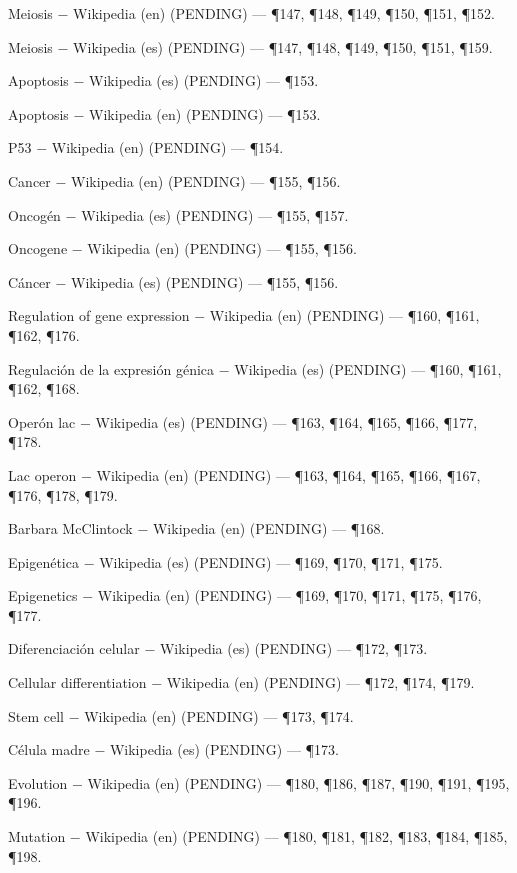 \documentclass{book}
\begin{document}
\noindent Meiosis \(-\) Wikipedia (en) (PENDING) --- \P147, \P148, \P149, \P150, \P151, \P152.

\noindent Meiosis \(-\) Wikipedia (es) (PENDING) --- \P147, \P148, \P149, \P150, \P151, \P159.

\noindent Apoptosis \(-\) Wikipedia (es) (PENDING) --- \P153.

\noindent Apoptosis \(-\) Wikipedia (en) (PENDING) --- \P153.

\noindent P53 \(-\) Wikipedia (en) (PENDING) --- \P154.

\noindent Cancer \(-\) Wikipedia (en) (PENDING) --- \P155, \P156.

\noindent Oncogén \(-\) Wikipedia (es) (PENDING) --- \P155, \P157.

\noindent Oncogene \(-\) Wikipedia (en) (PENDING) --- \P155, \P156.

\noindent Cáncer \(-\) Wikipedia (es) (PENDING) --- \P155, \P156.

\noindent Regulation of gene expression \(-\) Wikipedia (en) (PENDING) --- \P160, \P161, \P162, \P176.

\noindent Regulación de la expresión génica \(-\) Wikipedia (es) (PENDING) --- \P160, \P161, \P162, \P168.

\noindent Operón lac \(-\) Wikipedia (es) (PENDING) --- \P163, \P164, \P165, \P166, \P177, \P178.

\noindent Lac operon \(-\) Wikipedia (en) (PENDING) --- \P163, \P164, \P165, \P166, \P167, \P176, \P178, \P179.

\noindent Barbara McClintock \(-\) Wikipedia (en) (PENDING) --- \P168.

\noindent Epigenética \(-\) Wikipedia (es) (PENDING) --- \P169, \P170, \P171, \P175.

\noindent Epigenetics \(-\) Wikipedia (en) (PENDING) --- \P169, \P170, \P171, \P175, \P176, \P177.

\noindent Diferenciación celular \(-\) Wikipedia (es) (PENDING) --- \P172, \P173.

\noindent Cellular differentiation \(-\) Wikipedia (en) (PENDING) --- \P172, \P174, \P179.

\noindent Stem cell \(-\) Wikipedia (en) (PENDING) --- \P173, \P174.

\noindent Célula madre \(-\) Wikipedia (es) (PENDING) --- \P173.

\noindent Evolution \(-\) Wikipedia (en) (PENDING) --- \P180, \P186, \P187, \P190, \P191, \P195, \P196.

\noindent Mutation \(-\) Wikipedia (en) (PENDING) --- \P180, \P181, \P182, \P183, \P184, \P185, \P198.
\end{document}
